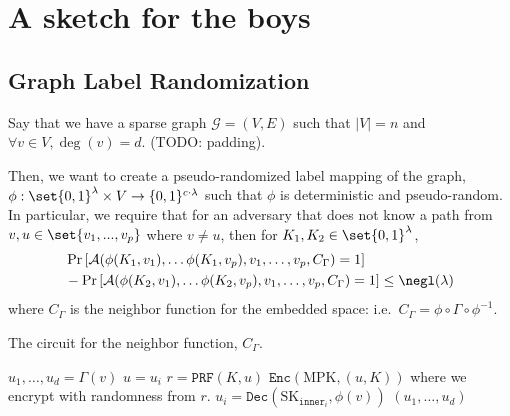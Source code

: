 \section{A sketch for the boys}
\newcommand{\graph}{\mathcal{G}}
\newcommand{\verts}{V}
\newcommand{\inner}{\texttt{inner}}
\newcommand{\edges}{E}
\newcommand{\maxDeg}{d}
\newcommand{\nVerts}{n}
\newcommand{\embedFn}{\phi}
\newcommand{\idealEmbedFn}{\Phi}
\newcommand{\circNeigb}{C_\Gamma}
\newcommand{\MPK}{\text{MPK}}
\newcommand{\MSK}{\text{MSK}}
\newcommand{\SK}{\text{SK}}

\newcommand{\advers}{\mathcal{A}}
\newcommand{\PRF}{\texttt{PRF}}
\newcommand{\Enc}{\texttt{Enc}}
\newcommand{\Dec}{\texttt{Dec}}
\newcommand{\Hyb}{\texttt{Hyb}}
\newcommand{\adversB}{\mathcal{B}}

\newcommand{\minEntropy}{I_\texttt{min}}

\subsection{Graph Label Randomization}
Say that we have a sparse graph $\graph = (\verts, \edges)$ such that $|\verts| = n$
and $\forall v \in \verts, \deg(v) = d$. (TODO: padding).

Then, we want to create a pseudo-randomized label mapping of the graph, $\embedFn: \set{0, 1}^\lambda \times \verts \rightarrow \{0, 1\}^{c \cdot \lambda}$
such that $\embedFn$ is deterministic and pseudo-random. In particular, we require that for an adversary 
that does not know a path from $v, u \in \set{v_1, ..., v_p}$ where $v \neq u$, then for $K_1, K_2 \in \set{0, 1}^\lambda$,
\begin{align}
	&\Pr\left[\advers(\embedFn(K_1, v_1), \dots \embedFn(K_1, v_{p}), v_1, \dots, v_p, \circNeigb) = 1\right]
	\label{eq:gameGRO}
	\\
	&- \Pr\left[\advers(\embedFn(K_2, v_1), \dots \embedFn(K_2, v_{p}), v_1, \dots, v_p, \circNeigb) = 1\right]
		\leq \negl(\lambda) \notag
\end{align}
where $\circNeigb$ is the neighbor function for the embedded space: i.e.\ $\circNeigb = \embedFn \circ \Gamma \circ \embedFn^{-1}$.


\begin{algorithm}[H]
	\caption{
		The circuit for the neighbor function, $\circNeigb$.
	}
	\begin{algorithmic}[1]
		\Function{$\inner_i$}{$\Dec(\phi(v)) = v, K$}
			\State $u_1, \dots, u_d = \Gamma(v)$
			\State $u = u_i$
			\State $r = \PRF(K, u)$
			\State \Return $\Enc(\MPK, (u, K))$ where we encrypt with randomness from $r$.
		\EndFunction
		\Function{$\circNeigb$}{$\phi(v)$}
				\State $u_i = \Dec(\SK_{\texttt{inner}_i}, \phi(v))$
			\EndFor
			\State \Return $(u_1, \dots, u_d)$
		\EndFunction
	\end{algorithmic}
	\label{alg:neighb}
\end{algorithm}

